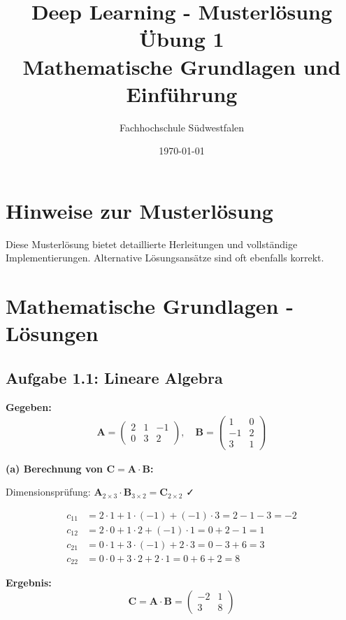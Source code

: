 \documentclass[12pt,a4paper]{article}
\title{\textbf{Deep Learning - Musterlösung Übung 1} \\ \large Mathematische Grundlagen und Einführung}
\author{Fachhochschule Südwestfalen}
\date{\today}
\begin{document}
\maketitle

\section*{Hinweise zur Musterlösung}
Diese Musterlösung bietet detaillierte Herleitungen und vollständige Implementierungen. Alternative Lösungsansätze sind oft ebenfalls korrekt.

\section{Mathematische Grundlagen - Lösungen}

\subsection{Aufgabe 1.1: Lineare Algebra}

\textbf{Gegeben:}
\begin{align}
\mathbf{A} = \begin{pmatrix} 2 & 1 & -1 \\ 0 & 3 & 2 \end{pmatrix}, \quad
\mathbf{B} = \begin{pmatrix} 1 & 0 \\ -1 & 2 \\ 3 & 1 \end{pmatrix}
\end{align}

\textbf{(a) Berechnung von $\mathbf{C} = \mathbf{A} \cdot \mathbf{B}$:}

Dimensionsprüfung: $\mathbf{A}_{2 \times 3} \cdot \mathbf{B}_{3 \times 2} = \mathbf{C}_{2 \times 2}$ ✓

\begin{align}
c_{11} &= 2 \cdot 1 + 1 \cdot (-1) + (-1) \cdot 3 = 2 - 1 - 3 = -2 \\
c_{12} &= 2 \cdot 0 + 1 \cdot 2 + (-1) \cdot 1 = 0 + 2 - 1 = 1 \\
c_{21} &= 0 \cdot 1 + 3 \cdot (-1) + 2 \cdot 3 = 0 - 3 + 6 = 3 \\
c_{22} &= 0 \cdot 0 + 3 \cdot 2 + 2 \cdot 1 = 0 + 6 + 2 = 8
\end{align}

\textbf{Ergebnis:}
\begin{equation}
\mathbf{C} = \mathbf{A} \cdot \mathbf{B} = \begin{pmatrix} -2 & 1 \\ 3 & 8 \end{pmatrix}
\end{equation}
\end{document}

